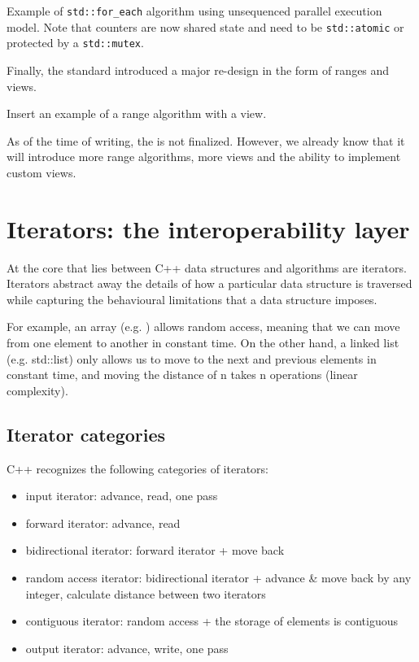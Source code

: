 \begin{box-note}
\footnotesize Example of \texttt{std::for_each} algorithm using unsequenced parallel execution model. Note that counters are now shared state and need to be \texttt{std::atomic} or protected by a \texttt{std::mutex}.
\tcblower
{}
\end{box-note}

Finally, the  standard introduced a major re-design in the form of ranges and views.

Insert an example of a range algorithm with a view.

As of the time of writing, the  is not finalized. However, we already know that it will introduce more range algorithms, more views and the ability to implement custom views.

\section{Iterators: the interoperability layer}

At the core that lies between C++ data structures and algorithms are iterators. Iterators abstract away the details of how a particular data structure is traversed while capturing the behavioural limitations that a data structure imposes.

For example, an array (e.g. \emph{}) allows random access, meaning that we can move from one element to another in constant time. On the other hand, a linked list (e.g. std::list) only allows us to move to the next and previous elements in constant time, and moving the distance of n takes n operations (linear complexity).

\subsection{Iterator categories}

C++ recognizes the following categories of iterators:

\begin{itemize}
    \item \gls{input iterator}: advance, read, one pass
    \item \gls{forward iterator}: advance, read
    \item \gls{bidirectional iterator}: forward iterator + move back
    \item \gls{random access iterator}: bidirectional iterator + advance \& move back by any integer, calculate distance between two iterators
    \item \gls{contiguous iterator}: random access + the storage of elements is contiguous
    \item \gls{output iterator}: advance, write, one pass
\end{itemize}

